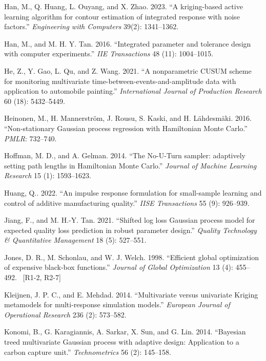\documentclass[]{interact}
\DeclareRobustCommand{\reviewadd}[2]{{\color{red}#1}\ {\color{blue}\footnotesize[#2]}}
\theoremstyle{plain}%
\theoremstyle{definition}
\theoremstyle{remark}
\begin{document}
\begin{thebibliography}{}
Han, M., Q. Huang, L. Ouyang, and X. Zhao. 2023. ``A kriging-based active learning algorithm for contour estimation of integrated response with noise factors.'' \emph{Engineering with Computers} 39(2): 1341--1362.

Han, M., and M. H. Y. Tan. 2016. ``Integrated parameter and tolerance design with computer experiments.'' \emph{IIE Transactions} 48 (11): 1004--1015.

He, Z., Y. Gao, L. Qu, and Z. Wang. 2021. ``A nonparametric CUSUM scheme for monitoring multivariate time-between-events-and-amplitude data with application to automobile painting.'' \emph{International Journal of Production Research} 60 (18): 5432--5449.

Heinonen, M., H. Mannerström, J. Rousu, S. Kaski, and H. Lähdesmäki. 2016. ``Non-stationary Gaussian process regression with Hamiltonian Monte Carlo.'' \emph{PMLR}: 732--740.

Hoffman, M. D., and A. Gelman. 2014. ``The No-U-Turn sampler: adaptively setting path lengths in Hamiltonian Monte Carlo.'' \emph{Journal of Machine Learning Research} 15 (1): 1593--1623.

Huang, Q.. 2022. ``An impulse response formulation for small-sample learning and control of additive manufacturing quality.'' \emph{IISE Transactions} 55 (9): 926--939.

Jiang, F., and M. H.-Y. Tan. 2021. ``Shifted log loss Gaussian process model for expected quality loss prediction in robust parameter design.'' \emph{Quality Technology \& Quantitative Management} 18 (5): 527--551.

\reviewadd{
Jones, D. R., M. Schonlau, and W. J. Welch. 1998. ``Efficient global optimization of expensive black-box functions.'' \emph{Journal of Global Optimization} 13 (4): 455--492.
}{R1-2, R2-7}

Kleijnen, J. P. C., and E. Mehdad. 2014. ``Multivariate versus univariate Kriging metamodels for multi-response simulation models.'' \emph{European Journal of Operational Research} 236 (2): 573--582.

Konomi, B., G. Karagiannis, A. Sarkar, X. Sun, and G. Lin. 2014. ``Bayesian treed multivariate Gaussian process with adaptive design: Application to a carbon capture unit.'' \emph{Technometrics} 56 (2): 145--158.


\end{thebibliography}
\end{document}
